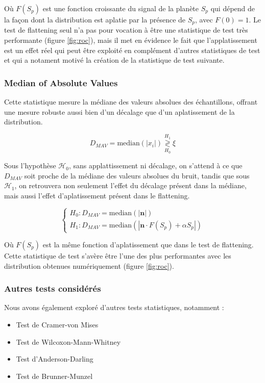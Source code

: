 \documentclass{article}
\begin{document}
Où $F(S_p)$ est une fonction croissante du signal de la planète $S_p$ qui dépend de la façon dont la distribution est aplatie par la présence de $S_p$, avec $F(0)=1$. Le test de flattening seul n'a pas pour vocation à être une statistique de test très performante (figure \ref{fig:roc}), mais il met en évidence le fait que l'applatissement est un effet réel qui peut être exploité en complément d'autres statistiques de test et qui a notament motivé la création de la statistique de test suivante.

\subsubsection{Median of Absolute Values}

Cette statistique mesure la médiane des valeurs absolues des échantillons, offrant une mesure robuste aussi bien d'un décalage que d'un aplatissement de la distribution.

$$
D_{MAV} = \text{median}(|x_i|) \stackrel{H_1}{\underset{H_0}{\gtrless}} \xi
$$

Sous l'hypothèse $\mathcal{H}_0$, sans applattissement ni décalage, on s'attend à ce que $D_{MAV}$ soit proche de la médiane des valeurs absolues du bruit, tandis que sous $\mathcal{H}_1$, on retrouvera non seulement l'effet du décalage présent dans la médiane, mais aussi l'effet d'aplatissement présent dans le flattening.

$$
\begin{cases}
H_0 : D_{MAV} = \text{median}(|\mathbf{n}|)\\
H_1 : D_{MAV} = \text{median}(|\mathbf{n} \cdot F(S_p) + \alpha S_p|)
\end{cases}
$$

Où $F(S_p)$ est la même fonction d'aplatissement que dans le test de flattening. Cette statistique de test s'avère être l'une des plus performantes avec les distribution obtenues numériquement (figure \ref{fig:roc}).

\subsubsection{Autres tests considérés}\label{sec:other_tests}
Nous avons également exploré d'autres tests statistiques, notamment :
\begin{itemize}
    \item Test de Cramer-von Mises
    \item Test de Wilcoxon-Mann-Whitney
    \item Test d'Anderson-Darling
    \item Test de Brunner-Munzel
\end{itemize}
\end{document}
